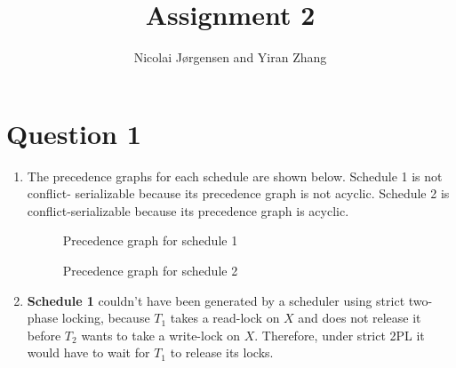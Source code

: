 \documentclass[11pt]{article}
\title          {Assignment 2}
\author         {Nicolai Jørgensen and Yiran Zhang}
\begin{document}
\maketitle
\newpage

\section{Question 1}

\begin{enumerate}
	\item
     The precedence graphs for each schedule are shown below. Schedule 1 is not conflict- serializable because its precedence graph is not acyclic. Schedule 2 is conflict-serializable because its precedence graph is acyclic.

		\begin{figure}[H]
			\centering

			\caption{Precedence graph for schedule 1} 
			\label{fig:trans-schedule-1} 
		\end{figure}

		\begin{figure}[H]
			\centering

			\caption{Precedence graph for schedule 2} 
			\label{fig:trans-schedule-1} 
		\end{figure}		
		
	\item
  \textbf{Schedule 1} couldn't have been generated by a scheduler using
  strict two-phase locking, because $T_1$ takes a read-lock on $X$ and does not
  release it before $T_2$ wants to take a write-lock on $X$. Therefore, under strict 2PL
  it would have to wait for $T_1$ to release its locks.
	

\end{enumerate}
\end{document}
